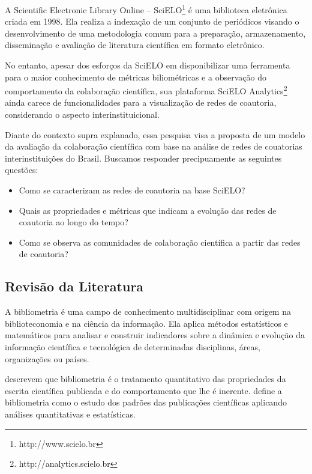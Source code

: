 \documentclass[12pt]{article}
\begin{document}
A Scientific Electronic Library Online -- SciELO\footnote{http://www.scielo.br} é uma biblioteca eletrônica criada em 1998.
Ela realiza a indexação de um conjunto de periódicos visando o desenvolvimento de uma metodologia comum para a preparação, armazenamento, disseminação e avaliação de literatura científica em formato eletrônico.

No entanto, apesar dos esforços da SciELO em disponibilizar uma ferramenta para o maior conhecimento de métricas biliométricas e a observação do comportamento da colaboração científica, sua plataforma SciELO Analytics\footnote{http://analytics.scielo.br} ainda carece de funcionalidades para a visualização de redes de coautoria, considerando o aspecto interinstituicional.

Diante do contexto supra explanado, essa pesquisa visa a proposta de um modelo da avaliação da colaboração científica com base na análise de redes de couatorias interinstituições do Brasil. 
Buscamos responder precipuamente as seguintes questões:
\begin{itemize}
\item Como se caracterizam as redes de coautoria na base SciELO?
\item Quais as propriedades e métricas que indicam a evolução das redes de coautoria ao longo do tempo?
\item Como se observa as comunidades de colaboração científica a partir das redes de coautoria?
\end{itemize}

\subsection{\textbf{Revisão da Literatura}}

A bibliometria é uma campo de conhecimento multidisciplinar com origem na biblioteconomia e na ciência da informação.
Ela aplica métodos estatísticos e matemáticos para analisar e construir indicadores sobre a dinâmica e evolução da informação científica e tecnológica de determinadas disciplinas, áreas, organizações ou países.

\cite{pritchard1969statistical} descrevem que bibliometria é o tratamento quantitativo das propriedades da escrita científica publicada e do comportamento que lhe é inerente. 
\cite{osareh1996bibliometrics} define a bibliometria como o estudo dos padrões das publicações científicas aplicando análises quantitativas e estatísticas. %
\end{document}
